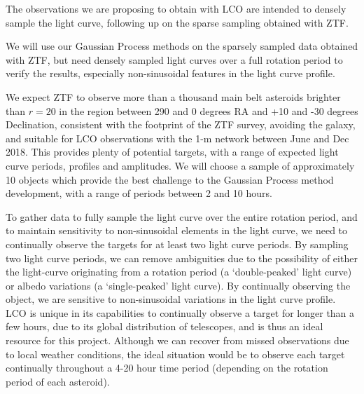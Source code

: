 \documentclass[11pt]{article}
\begin{document}
%

%

\expdesign
The observations we are proposing to obtain with LCO are intended to
densely sample the light curve, following up on the sparse sampling
obtained with ZTF.

We will use our Gaussian Process methods on the sparsely sampled data
obtained with ZTF, but need densely sampled light curves over a full
rotation period to verify the results, especially non-sinusoidal
features in the light curve profile. 

We expect ZTF to observe more than a thousand main belt asteroids
brighter than $r=20$ in the region between 290 and 0 degrees RA and 
+10 and -30 degrees Declination, consistent with the footprint of the
ZTF survey, avoiding the galaxy, and suitable for LCO observations with
the 1-m network between June and Dec 2018. This provides plenty of
potential targets, with a range of expected light curve periods,
profiles and amplitudes. We will choose a sample of approximately 10
objects which provide the best challenge to the Gaussian Process method
development, with a range of periods between 2 and 10 hours. 

To gather data to fully sample the light curve over the entire rotation
period, and to maintain sensitivity to non-sinusoidal elements in the
light curve, we need to continually observe the targets for at least
two light curve periods. By sampling two light curve periods, we can
remove ambiguities due to the possibility of either the light-curve
originating from a rotation period (a `double-peaked' light curve) or
albedo variations (a `single-peaked' light curve).  By continually
observing the object, we are sensitive to non-sinusoidal variations in
the light curve profile. LCO is unique in its capabilities to
continually observe a target for longer than a few hours, due to its
global distribution of telescopes, and is thus an ideal resource for
this project. Although we can recover from missed observations due to
local weather conditions, the ideal situation would be to observe each
target continually throughout a 4-20 hour time period (depending on the
rotation period of each asteroid). 
\end{document}
